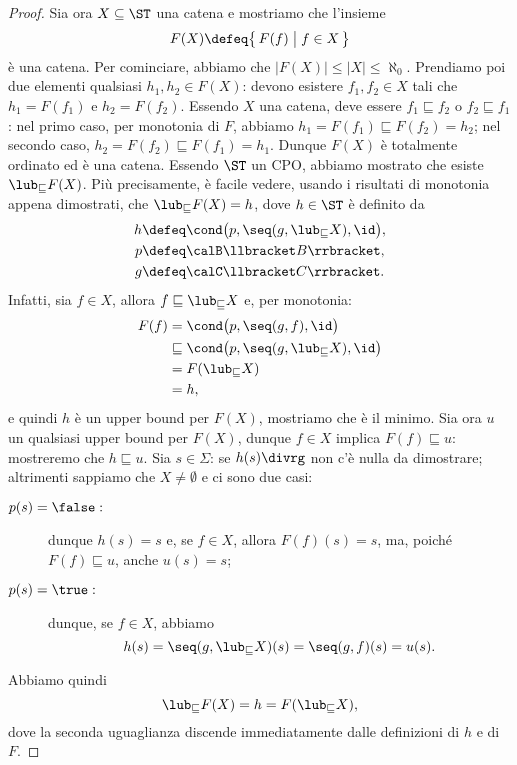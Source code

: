 \begin{proof}
Sia ora $X \subseteq \ST$ una catena e mostriamo che l'insieme
\[
  F(X) \defeq \bigl\{\, F(f) \bigm| f \in X \,\bigr\}
\]
\`e una catena.
Per cominciare, abbiamo che $\bigl|F(X)\bigr| \leq |X| \leq \aleph_0$.
Prendiamo poi due elementi qualsiasi $h_1, h_2 \in F(X)$:
devono esistere $f_1, f_2 \in X$ tali che $h_1 = F(f_1)$ e $h_2 = F(f_2)$.
Essendo $X$ una catena, deve essere $f_1 \sqsubseteq f_2$
o $f_2 \sqsubseteq f_1$: nel primo caso, per monotonia di $F$, abbiamo
$h_1 = F(f_1) \sqsubseteq F(f_2) = h_2$;
nel secondo caso,
$h_2 = F(f_2) \sqsubseteq F(f_1) = h_1$.
Dunque $F(X)$ \`e totalmente ordinato ed \`e una catena.
Essendo $\ST$ un CPO, abbiamo mostrato che esiste $\lub_{\sqsubseteq} F(X)$.
Più precisamente, \`e facile vedere, usando i risultati di monotonia
appena dimostrati, che $\lub_{\sqsubseteq} F(X) = h$,
dove $h \in \ST$ è definito da
\begin{align*}
  h &\defeq \cond\bigl(p, \seq(g, \lub_{\sqsubseteq} X), \id\bigr), \\
  p &\defeq \calB \llbracket B \rrbracket, \\
  g &\defeq \calC \llbracket C \rrbracket.
\end{align*}
Infatti, sia $f \in X$, allora $f \sqsubseteq \lub_{\sqsubseteq} X$ e, per monotonia:
\begin{align*}
  F(f)
    &=
      \cond\bigl(p, \seq(g, f), \id\bigr) \\
    &\sqsubseteq
      \cond\bigl(p, \seq(g, \lub_{\sqsubseteq} X), \id\bigr) \\
    &=F(\lub_{\sqsubseteq} X)\\
    &= h,
\end{align*}
e quindi $h$ \`e un upper bound per $F(X)$, mostriamo che \`e il minimo.
Sia ora $u$ un qualsiasi upper bound per $F(X)$,
dunque $f \in X$ implica $F(f) \sqsubseteq u$:
mostreremo che $h \sqsubseteq u$.
Sia $s \in \Sigma$:
se $h(s)\divrg$ non c'\`e nulla da dimostrare;
altrimenti sappiamo che $X \neq \emptyset$ e
ci sono due casi:
\begin{description}
\item[$p(s) = \false:$]
dunque $h(s) = s$ e, se $f \in X$, allora $F(f)(s) = s$,
ma, poich\'e $F(f) \sqsubseteq u$, anche $u(s) = s$;
\item[$p(s) = \true:$]
dunque, se $f \in X$, abbiamo
\[
  h(s) = \seq(g, \lub_{\sqsubseteq} X)(s) = \seq(g, f)(s) = u(s).
\]
\end{description}
Abbiamo quindi
\[
  \lub_{\sqsubseteq} F(X) = h = F(\lub_{\sqsubseteq} X),
\]
dove la seconda uguaglianza discende immediatamente dalle definizioni
di $h$ e di $F$.
\end{proof}

